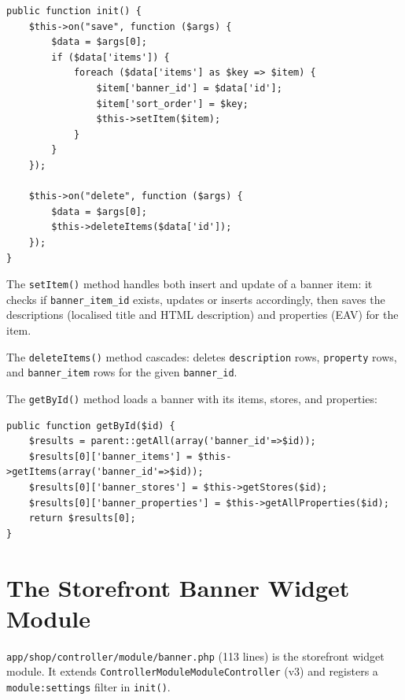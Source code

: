 \documentclass[11pt,a4paper]{article}
\begin{document}
\begin{lstlisting}[caption={\texttt{ModelContentBanner} --- the on('save') hook for items.},label={lst:banner-model-save}]
public function init() {
    $this->on("save", function ($args) {
        $data = $args[0];
        if ($data['items']) {
            foreach ($data['items'] as $key => $item) {
                $item['banner_id'] = $data['id'];
                $item['sort_order'] = $key;
                $this->setItem($item);
            }
        }
    });

    $this->on("delete", function ($args) {
        $data = $args[0];
        $this->deleteItems($data['id']);
    });
}
\end{lstlisting}

The \texttt{setItem()} method handles both insert and update of a
banner item: it checks if \texttt{banner\_item\_id} exists, updates or
inserts accordingly, then saves the descriptions (localised title and
HTML description) and properties (EAV) for the item.

The \texttt{deleteItems()} method cascades: deletes
\texttt{description} rows, \texttt{property} rows, and
\texttt{banner\_item} rows for the given \texttt{banner\_id}.

The \texttt{getById()} method loads a banner with its items, stores,
and properties:

\begin{lstlisting}[caption={\texttt{ModelContentBanner::getById()} --- loads banner with items.},label={lst:banner-getbyid}]
public function getById($id) {
    $results = parent::getAll(array('banner_id'=>$id));
    $results[0]['banner_items'] = $this->getItems(array('banner_id'=>$id));
    $results[0]['banner_stores'] = $this->getStores($id);
    $results[0]['banner_properties'] = $this->getAllProperties($id);
    return $results[0];
}
\end{lstlisting}

\section{The Storefront Banner Widget Module}\label{sec:storefront}

\texttt{app/shop/controller/module/banner.php} (113 lines) is the
storefront widget module. It extends
\texttt{ControllerModuleModuleController} (v3) and registers a
\texttt{module:settings} filter in \texttt{init()}.
\end{document}
